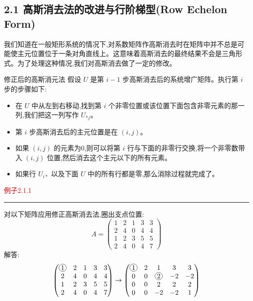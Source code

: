 \documentclass[10pt, a4paper]{article}
\newcommand{\circlednum}[1]{%
    \tikz[baseline=(char.base)]{%
        \node[draw, circle, inner sep=1pt] (char) {#1};%
    }%
}
\begin{document}
\subsection*{2.1 高斯消去法的改进与行阶梯型(Row Echelon Form)}
我们知道在一般矩形系统的情况下,对系数矩阵作高斯消去时在矩阵中并不总是可能使主元位置位于一条对角直线上。这意味着高斯消去的最终结果不会是三角形式。为了处理这种情况,我们对高斯消去做了一定的修改。

\begin{bluebox}{修正后的高斯消元法}
假设 \(U\) 是第 \(i-1\) 步高斯消去后的系统增广矩阵。执行第 \(i\) 步的步骤如下:
\begin{itemize}
    \item 在 \(U\) 中从左到右移动,找到第 \(i\) 个非零位置或该位置下面包含非零元素的那一列,我们把这一列写作 \(U_{* j}\)。
    \item 第 \(i\) 步高斯消去后的主元位置是在 \((i, j)\)。
    \item 如果 \((i, j)\) 的元素为0,则可以将第 \(i\) 行与下面的非零行交换,将一个非零数带入 \((i, j)\) 位置,然后消去这个主元以下的所有元素。
    \item 如果行 \(U_{i *}\) 以及下面 \(U\) 中的所有行都是零,那么消除过程就完成了。
\end{itemize}
\end{bluebox}

\textcolor{red}{例子2.1.1}
\color{red}\rule{\textwidth}{0.4pt}\color{black}

对以下矩阵应用修正高斯消去法,圈出支点位置:
\[
A=\begin{pmatrix} 
1 & 2 & 1 & 3 & 3 \\ 
2 & 4 & 0 & 4 & 4 \\ 
1 & 2 & 3 & 5 & 5 \\ 
2 & 4 & 0 & 4 & 7 
\end{pmatrix}
\]
解答:
\[
\begin{pmatrix} 
\circlednum{1} & 2 & 1 & 3 & 3 \\ 
2 & 4 & 0 & 4 & 4 \\ 
1 & 2 & 3 & 5 & 5 \\ 
2 & 4 & 0 & 4 & 7 
\end{pmatrix}
\to
\begin{pmatrix} 
\circlednum{1} & 2 & 1 & 3 & 3 \\ 
0 & 0 & \circlednum{2} & -2 & -2 \\ 
0 & 0 & 2 & 2 & 2 \\ 
0 & 0 & -2 & -2 & 1 
\end{pmatrix}
\]
\end{document}
